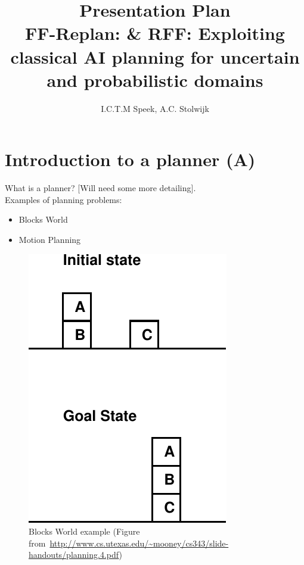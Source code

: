 \documentclass[runningheads,a4paper]{llncs}
\begin{document}
\mainmatter%

\title{Presentation Plan\\
FF-Replan: \& RFF\@: Exploiting classical AI planning for uncertain and probabilistic domains}


\author{I.C.T.M Speek, A.C. Stolwijk}

%



\maketitle

\section{Introduction to a planner (A)}

What is a planner? [Will need some more detailing].\\

Examples of planning problems:

\begin{itemize}
	\item Blocks World
	\item Motion Planning
\end{itemize}

\begin{figure}[htb]%
\includegraphics[width=0.4\columnwidth]{blocksworld.pdf}%
\caption{Blocks World example (Figure from~\url{http://www.cs.utexas.edu/~mooney/cs343/slide-handouts/planning.4.pdf})}%
\label{fig:blocksworld}%
\end{figure}
\end{document}
